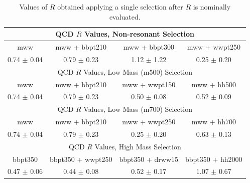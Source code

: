 \begin{table}[h!]
\centering

\begin{tabular}{c|c|c|c}
\hline\hline



\multicolumn{4}{c}{QCD $R$ Values, Non-resonant Selection}\\\hline\hline
mww 	                & mww + bbpt210 	& mww + bbpt300 	& mww + wwpt250 	\\\hline 
0.74 $\pm$ 0.04 	& 0.79 $\pm$ 0.23 	& 1.12 $\pm$ 1.22 	& 0.25 $\pm$ 0.20 	\\\hline \hline
\multicolumn{4}{c}{QCD $R$ Values, Low Mass (m500) Selection}\\\hline\hline
mww 	                & mww + bbpt210 	& mww + wwpt150 	& mww + hh500	  \\\hline 
0.74 $\pm$ 0.04 	& 0.79 $\pm$ 0.23 	& 0.50 $\pm$ 0.08 	& 0.52 $\pm$ 0.09  \\\hline \hline
\multicolumn{4}{c}{QCD $R$ Values, Low Mass (m700) Selection}\\\hline\hline
mww 	                & mww + bbpt210 	& mww + wwpt250 	& mww + hh700	  \\\hline 
0.74 $\pm$ 0.04 	& 0.79 $\pm$ 0.23 	& 0.25 $\pm$ 0.20 	& 0.63 $\pm$ 0.13  \\\hline \hline
\multicolumn{4}{c}{QCD $R$ Values, High Mass Selection}\\\hline\hline
bbpt350 	        & bbpt350 + wwpt250 	& bbpt350 + drww15 	& bbpt350 + hh2000	\\\hline 
0.47 $\pm$ 0.06 	& 0.44 $\pm$ 0.08 	& 0.52 $\pm$ 0.17	& 1.07 $\pm$ 0.67 	\\\hline 

\hline\hline
\end{tabular}

\caption[Cross check for coorelation with R]{Values of $R$ obtained applying a single selection after $R$ is nominally evaluated.} \label{tab:R_after_X}
\end{table}


